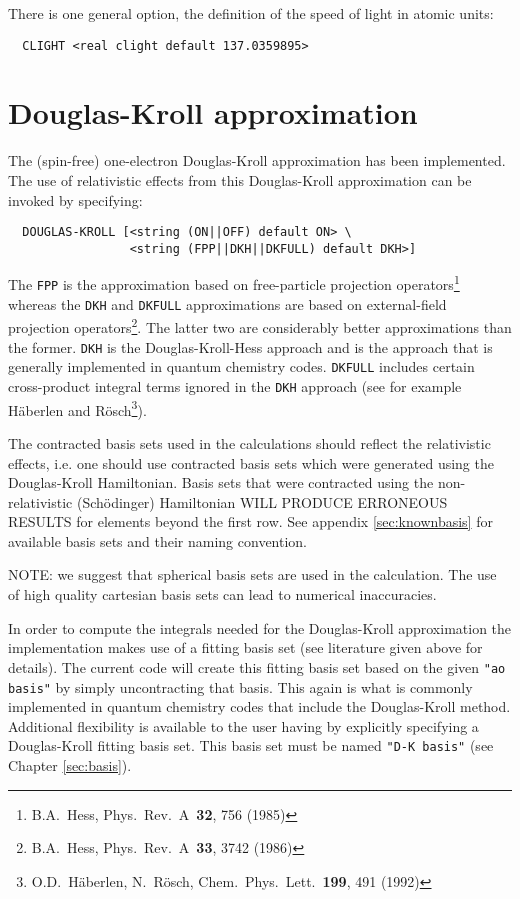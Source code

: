 There is one general option, the definition of the speed of light in atomic units:

\begin{verbatim}
  CLIGHT <real clight default 137.0359895>
\end{verbatim}

\section{Douglas-Kroll approximation}
\label{sec:douglas-kroll}


The (spin-free) one-electron Douglas-Kroll approximation has been
implemented. The use of relativistic effects from this Douglas-Kroll
approximation can be invoked by specifying:

\begin{verbatim}
  DOUGLAS-KROLL [<string (ON||OFF) default ON> \
                 <string (FPP||DKH||DKFULL) default DKH>]

\end{verbatim}

The \verb+FPP+ is the approximation based on free-particle projection 
operators\footnote{B.A.~Hess, Phys.~Rev.~A~{\bf 32}, 756 (1985)} whereas the 
\verb+DKH+ and \verb+DKFULL+ approximations are based on external-field 
projection operators\footnote{B.A.~Hess, Phys.~Rev.~A~{\bf 33}, 3742 (1986)}.
The latter two are considerably better approximations than the former. \verb+DKH+ 
is the Douglas-Kroll-Hess approach and is the approach that is generally 
implemented in quantum chemistry codes. \verb+DKFULL+ includes certain 
cross-product integral terms ignored in the \verb+DKH+ approach (see for example 
H\"{a}berlen and R\"{o}sch\footnote{O.D.~H\"{a}berlen, N.~R\"{o}sch, 
Chem.~Phys.~Lett.~{\bf 199}, 491 (1992)}).

The contracted basis sets used in the calculations should reflect the relativistic
effects, i.e. one should use contracted basis sets which were generated using the 
Douglas-Kroll Hamiltonian. Basis sets that were contracted using the 
non-relativistic (Sch\"{o}dinger) Hamiltonian WILL PRODUCE ERRONEOUS RESULTS for
elements beyond the first row. See appendix \ref{sec:knownbasis} for available
basis sets and their naming convention.

NOTE: we suggest that spherical basis sets are used in the calculation. The use of 
high quality cartesian basis sets can lead to numerical inaccuracies.

In order to compute the integrals needed for the Douglas-Kroll approximation
the implementation makes use of a fitting basis set (see literature given
above for details). The current code will create this fitting basis set
based on the given {\tt "ao basis"} by simply uncontracting that basis. This
again is what is commonly implemented in quantum chemistry codes that
include the Douglas-Kroll method.  Additional flexibility is available to
the user having by explicitly specifying a Douglas-Kroll fitting basis
set. This basis set must be named {\tt "D-K basis"} (see Chapter
\ref{sec:basis}).

